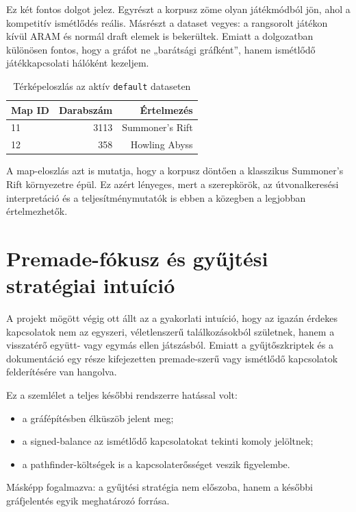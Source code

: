 \documentclass[a4paper,12pt]{report}
\begin{document}
Ez két fontos dolgot jelez. Egyrészt a korpusz zöme olyan játékmódból jön, ahol a kompetitív ismétlődés reális. Másrészt a dataset vegyes: a rangsorolt játékon kívül ARAM és normál draft elemek is bekerültek. Emiatt a dolgozatban különösen fontos, hogy a gráfot ne „barátsági gráfként”, hanem ismétlődő játékkapcsolati hálóként kezeljem.

\begin{table}[H]
\centering
\caption{Térképeloszlás az aktív \texttt{default} dataseten}
\begin{tabular}{lrr}
\toprule
\textbf{Map ID} & \textbf{Darabszám} & \textbf{Értelmezés} \\
\midrule
11 & 3113 & Summoner's Rift \\
12 & 358 & Howling Abyss \\
\bottomrule
\end{tabular}
\end{table}

A map-eloszlás azt is mutatja, hogy a korpusz döntően a klasszikus Summoner's Rift környezetre épül. Ez azért lényeges, mert a szerepkörök, az útvonalkeresési interpretáció és a teljesítménymutatók is ebben a közegben a legjobban értelmezhetők.

\section{Premade-fókusz és gyűjtési stratégiai intuíció}

A projekt mögött végig ott állt az a gyakorlati intuíció, hogy az igazán érdekes kapcsolatok nem az egyszeri, véletlenszerű találkozásokból születnek, hanem a visszatérő együtt- vagy egymás ellen játszásból. Emiatt a gyűjtőszkriptek és a dokumentáció egy része kifejezetten premade-szerű vagy ismétlődő kapcsolatok felderítésére van hangolva.

Ez a szemlélet a teljes későbbi rendszerre hatással volt:

\begin{itemize}
    \item a gráfépítésben élküszöb jelent meg;
    \item a signed-balance az ismétlődő kapcsolatokat tekinti komoly jelöltnek;
    \item a pathfinder-költségek is a kapcsolaterősséget veszik figyelembe.
\end{itemize}

Másképp fogalmazva: a gyűjtési stratégia nem előszoba, hanem a későbbi gráfjelentés egyik meghatározó forrása.
\end{document}
